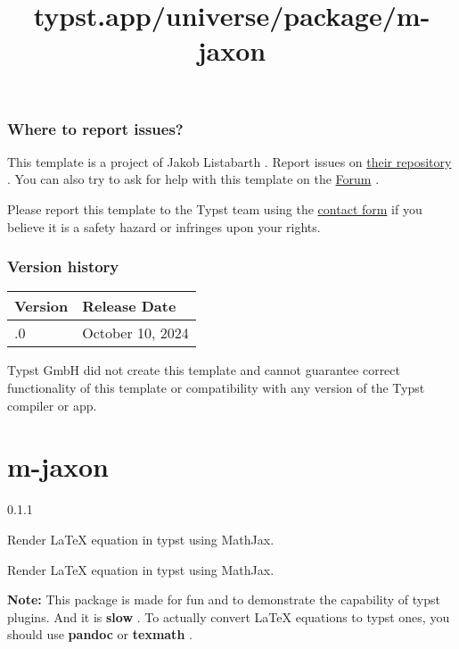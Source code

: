 \subsubsection{Where to report issues?}\label{where-to-report-issues}

This template is a project of Jakob Listabarth . Report issues on
\href{https://github.com/jakoblistabarth/tud-corporate-design-slides-typst}{their
repository} . You can also try to ask for help with this template on the
\href{https://forum.typst.app}{Forum} .

Please report this template to the Typst team using the
\href{https://typst.app/contact}{contact form} if you believe it is a
safety hazard or infringes upon your rights.

\label{versions}
\subsubsection{Version history}\label{version-history}

\begin{longtable}[]{@{}ll@{}}
\toprule\noalign{}
Version & Release Date \\
\midrule\noalign{}
\endhead
\bottomrule\noalign{}
\endlastfoot
0.1.0 & October 10, 2024 \\
\end{longtable}

Typst GmbH did not create this template and cannot guarantee correct
functionality of this template or compatibility with any version of the
Typst compiler or app.


\title{typst.app/universe/package/m-jaxon}

\label{banner}
\section{m-jaxon}\label{m-jaxon}

{ 0.1.1 }

Render LaTeX equation in typst using MathJax.

\label{readme}
Render LaTeX equation in typst using MathJax.

\textbf{Note:} This package is made for fun and to demonstrate the
capability of typst plugins. And it is \textbf{slow} . To actually
convert LaTeX equations to typst ones, you should use \textbf{pandoc} or
\textbf{texmath} .

\pandocbounded{}

